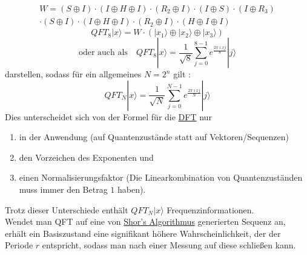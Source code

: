 \begin{multline}
	W = (S\oplus I)\cdot (I \oplus H \oplus I) \cdot (R_2 \oplus I) \cdot (I \oplus S) \cdot (I\oplus R_3)\\ \cdot (S \oplus I) \cdot (I \oplus H \oplus I) \cdot (R_2 \oplus I) \cdot (H \oplus I \oplus I)
\end{multline}
\[QFT_8 |x\rangle = W \cdot \left(|x_1\rangle \oplus |x_2\rangle \oplus |x_3\rangle\right)\]
\[\text{oder auch als}\quad QFT_8 |x\rangle = \frac{1}{\sqrt{8}}\sum_{j=0}^{8-1} e^{\frac{2\pi \imath x j}{8}}|j\rangle\]
darstellen, sodass für ein allgemeines \(N = 2^n\) gilt \cite{noauthor_quanten-fouriertransformation_2024}:
\[QFT_N |x\rangle = \frac{1}{\sqrt{N}}\sum_{j=0}^{N-1} e^{\frac{2\pi \imath x j}{N}}|j\rangle\]
Dies unterscheidet sich von der Formel für die \hyperref[sec:DFT]{DFT} nur
\begin{enumerate}
	\item in der Anwendung (auf Quantenzustände statt auf Vektoren/Sequenzen)
	\item den Vorzeichen des Exponenten und
	\item einen Normalisierungsfaktor (Die Linearkombination von Quantenzuständen muss immer den Betrag \(1\) haben).
\end{enumerate}
Trotz dieser Unterschiede enthält \(QFT_N |x\rangle\) Frequenzinformationen.\\
Wendet man QFT auf eine von \hyperref[sec:shor]{Shor's Algorithmus} generierten Sequenz an, erhält ein Basiszustand eine signifikant höhere Wahrscheinlichkeit, der der Periode \(r\) entspricht, sodass man nach einer Messung auf diese schließen kann.